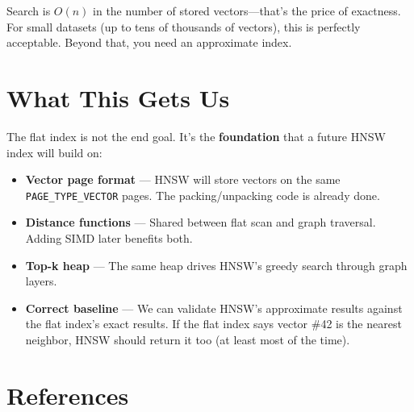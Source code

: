 \documentclass[12pt, a4paper]{report}
\begin{document}
Search is $O(n)$ in the number of stored vectors---that's the price of
exactness. For small datasets (up to tens of thousands of vectors), this
is perfectly acceptable. Beyond that, you need an approximate index.


\section{What This Gets Us}

The flat index is not the end goal. It's the \textbf{foundation} that a
future HNSW index will build on:

\begin{itemize}[itemsep=4pt]
    \item \textbf{Vector page format} --- HNSW will store vectors on the same
          \texttt{PAGE\_TYPE\_VECTOR} pages. The packing/unpacking code is
          already done.
    \item \textbf{Distance functions} --- Shared between flat scan and graph
          traversal. Adding SIMD later benefits both.
    \item \textbf{Top-k heap} --- The same heap drives HNSW's greedy
          search through graph layers.
    \item \textbf{Correct baseline} --- We can validate HNSW's approximate
          results against the flat index's exact results. If the flat
          index says vector \#42 is the nearest neighbor, HNSW should
          return it too (at least most of the time).
\end{itemize}


\section{References}
\end{document}
